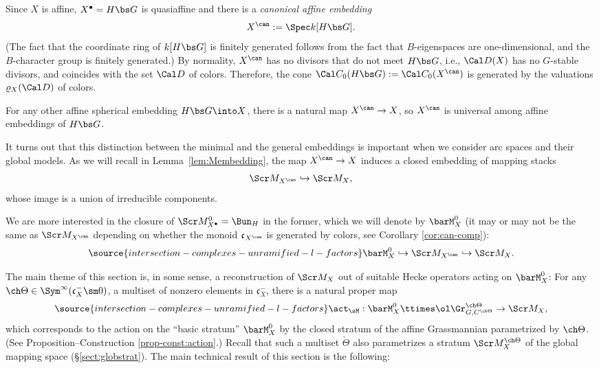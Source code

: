 Since $X$ is affine, $X^\bullet=H\bs G$ is quasiaffine and there is a
\emph{canonical affine embedding}
\[ X^\can := \Spec k[H\bs G]. \]
(The fact that the coordinate ring of $k[H\bs G]$ is finitely generated follows from the fact that $B$-eigenspaces are one-dimensional, and the $B$-character group is finitely generated.) By normality, $X^\can$ has no divisors that do not meet $H\bs G$,
i.e., $\Cal D(X)$ has no $G$-stable divisors, and coincides with the set $\Cal D$ of colors.
Therefore, the cone $\Cal C_0(H\bs G):= \Cal C_0(X^\can)$
is generated by the valuations $\varrho_X(\Cal D)$ of colors.

For any other affine spherical embedding $H\bs G\into X$, there is
a natural map $X^\can \to X$, so $X^\can$ is universal among affine embeddings
of $H\bs G$.

It turns out that this distinction between the minimal and the general embeddings is important when we consider arc spaces and their global models.
As we will recall in Lemma~\ref{lem:Membedding}, the map $X^\can \to X$ induces a closed embedding of mapping stacks
\[ \Scr M_{X^\can} \hookrightarrow \Scr M_X,\]
whose image is a union of irreducible components.

We are more interested in the closure of $\Scr M^0_{X^\bullet} = \Bun_H$ in the former, which we will denote by $\barM_X^0$ (it may or may not be the same as $\Scr M_{X^\can}$ depending on whether the monoid $\mathfrak c_{X^\can}$ is generated by colors, see Corollary \ref{cor:can-comp}):
\begin{equation}
 \label{cantogeneral}
\source{intersection-complexes-unramified-l-factors}
\barM_X^0 \hookrightarrow \Scr M_{X^\can} \hookrightarrow \Scr M_X.
\end{equation}



The main theme of this section is, in some sense, a reconstruction of $\Scr M_X$ out of suitable Hecke operators acting on $\barM_X^0$:
For any $\ch\Theta \in \Sym^\infty(\mathfrak c_X^-\sm 0)$, a multiset of nonzero elements in $\mathfrak c_X^-$,
there is a natural proper map
\begin{equation} \label{equation-action}
\source{intersection-complexes-unramified-l-factors}
\act_\sM : \barM_X^0 \ttimes \ol\Gr^{\ch\Theta}_{G, C^{\ch\Theta}} \to
\Scr M_X,
\end{equation}
which corresponds to the action on the ``basic stratum'' $\barM_X^0$ by the closed stratum of the affine Grassmannian parametrized by $\ch\Theta$.
(See Proposition--Construction \ref{prop-const:action}.) Recall that such a multiset $\check\Theta$ also parametrizes a stratum $\Scr M^{\ch\Theta}_X$ of the global mapping space (\S \ref{sect:globstrat}). The main technical result of this section is the following:

